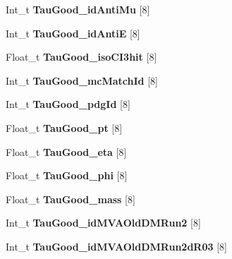\begin{DoxyCompactItemize}
\item 
\hypertarget{classMiniTree_aeacca944ecfaa0a8fce3a8d3ae7ca2d1}{}\label{classMiniTree_aeacca944ecfaa0a8fce3a8d3ae7ca2d1} 
Int\+\_\+t {\bfseries Tau\+Good\+\_\+id\+Anti\+Mu} \mbox{[}8\mbox{]}
\item 
\hypertarget{classMiniTree_aeec072157abafbf0c9ab7a9515b46679}{}\label{classMiniTree_aeec072157abafbf0c9ab7a9515b46679} 
Int\+\_\+t {\bfseries Tau\+Good\+\_\+id\+AntiE} \mbox{[}8\mbox{]}
\item 
\hypertarget{classMiniTree_a5176849eb5d8bbf9c3742c22d2ece658}{}\label{classMiniTree_a5176849eb5d8bbf9c3742c22d2ece658} 
Float\+\_\+t {\bfseries Tau\+Good\+\_\+iso\+C\+I3hit} \mbox{[}8\mbox{]}
\item 
\hypertarget{classMiniTree_aeafbbacdc2d5566ce1b5a112ffe0ac80}{}\label{classMiniTree_aeafbbacdc2d5566ce1b5a112ffe0ac80} 
Int\+\_\+t {\bfseries Tau\+Good\+\_\+mc\+Match\+Id} \mbox{[}8\mbox{]}
\item 
\hypertarget{classMiniTree_a7675afaf0595f3fbb90fde4577bd32fa}{}\label{classMiniTree_a7675afaf0595f3fbb90fde4577bd32fa} 
Int\+\_\+t {\bfseries Tau\+Good\+\_\+pdg\+Id} \mbox{[}8\mbox{]}
\item 
\hypertarget{classMiniTree_a9e71d5199b75c04753ac83b47f3e8c74}{}\label{classMiniTree_a9e71d5199b75c04753ac83b47f3e8c74} 
Float\+\_\+t {\bfseries Tau\+Good\+\_\+pt} \mbox{[}8\mbox{]}
\item 
\hypertarget{classMiniTree_af2b166d5abf759c8f1b373411d34501c}{}\label{classMiniTree_af2b166d5abf759c8f1b373411d34501c} 
Float\+\_\+t {\bfseries Tau\+Good\+\_\+eta} \mbox{[}8\mbox{]}
\item 
\hypertarget{classMiniTree_ac5c371da0057a9c2d580cbbcd337e550}{}\label{classMiniTree_ac5c371da0057a9c2d580cbbcd337e550} 
Float\+\_\+t {\bfseries Tau\+Good\+\_\+phi} \mbox{[}8\mbox{]}
\item 
\hypertarget{classMiniTree_a01178c4df19cd47f3e0c290ba99bec11}{}\label{classMiniTree_a01178c4df19cd47f3e0c290ba99bec11} 
Float\+\_\+t {\bfseries Tau\+Good\+\_\+mass} \mbox{[}8\mbox{]}
\item 
\hypertarget{classMiniTree_a434aab451fde20735b2b76dca8346a0a}{}\label{classMiniTree_a434aab451fde20735b2b76dca8346a0a} 
Int\+\_\+t {\bfseries Tau\+Good\+\_\+id\+M\+V\+A\+Old\+D\+M\+Run2} \mbox{[}8\mbox{]}
\item 
\hypertarget{classMiniTree_a581e4b80d612c5222285f1497652be30}{}\label{classMiniTree_a581e4b80d612c5222285f1497652be30} 
Int\+\_\+t {\bfseries Tau\+Good\+\_\+id\+M\+V\+A\+Old\+D\+M\+Run2d\+R03} \mbox{[}8\mbox{]}

\end{DoxyCompactItemize}
